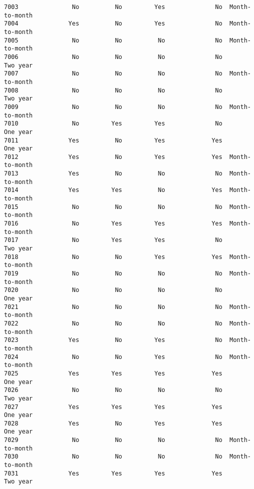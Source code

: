 \documentclass[11pt]{article}
\begin{document}
\begin{tcolorbox}[breakable, boxrule=.5pt, size=fbox, pad at break*=1mm, opacityfill=0]
\begin{Verbatim}[commandchars=\\\{\}]
7003               No          No         Yes              No  Month-to-month
7004              Yes          No         Yes              No  Month-to-month
7005               No          No          No              No  Month-to-month
7006               No          No          No              No        Two year
7007               No          No          No              No  Month-to-month
7008               No          No          No              No        Two year
7009               No          No          No              No  Month-to-month
7010               No         Yes         Yes              No        One year
7011              Yes          No         Yes             Yes        One year
7012              Yes          No         Yes             Yes  Month-to-month
7013              Yes          No          No              No  Month-to-month
7014              Yes         Yes          No             Yes  Month-to-month
7015               No          No          No              No  Month-to-month
7016               No         Yes         Yes             Yes  Month-to-month
7017               No         Yes         Yes              No        Two year
7018               No          No         Yes             Yes  Month-to-month
7019               No          No          No              No  Month-to-month
7020               No          No          No              No        One year
7021               No          No          No              No  Month-to-month
7022               No          No          No              No  Month-to-month
7023              Yes          No         Yes              No  Month-to-month
7024               No          No         Yes              No  Month-to-month
7025              Yes         Yes         Yes             Yes        One year
7026               No          No          No              No        Two year
7027              Yes         Yes         Yes             Yes        One year
7028              Yes          No         Yes             Yes        One year
7029               No          No          No              No  Month-to-month
7030               No          No          No              No  Month-to-month
7031              Yes         Yes         Yes             Yes        Two year


\end{Verbatim}
\end{tcolorbox}
\end{document}
